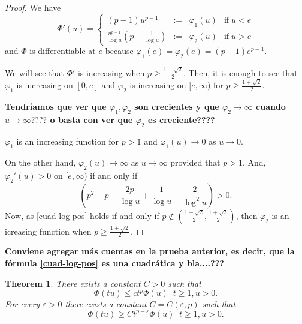 \documentclass[twoside]{article}
\newtheorem{thm}{Theorem}[section]
\theoremstyle{remark}
\renewcommand{\leq}{\leqslant}
\begin{document}
\begin{proof}
We have 
\[\Phi'(u)=\left\{
\begin{array}{cccc}
(p-1)u^{p-1}&:=&\varphi_1(u)& \mbox{if}\;u<e
\\
\frac{u^{p-1}}{\log u}(p-\frac{1}{\log u})&:=&\varphi_2(u)&\mbox{if}\; u>e
\end{array}
\right.
\]
and $\Phi$ is differentiable at $e$ because $\varphi_1(e)=\varphi_2(e)=(p-1)e^{p-1}$.

We will see that $\Phi'$ is increasing when $p\geq \frac{1+\sqrt {2}}{2}$.
Then, it is enough to see that $\varphi_1$ is increasing  on $[0,e]$ and $\varphi_2$ is increasing on 
$[e,\infty)$ for $p\geq \frac{1+\sqrt {2}}{2}$.

{\bf Tendr\'iamos que ver que $\varphi_1,\varphi_2$ son crecientes y que $\varphi_2\to \infty$ cuando
$u \to \infty????$ o basta con ver que $\varphi_2$ es creciente????}

$\varphi_1$ is an increasing function for $p>1$ and $\varphi_1(u)\to 0$ as $u \to 0$.

On the other hand, $\varphi_2(u)\to \infty$ as $u \to \infty$ provided that $p>1$.
And,  
$\varphi_2'(u)>0$
on $[e,\infty)$ if and only if 
\begin{equation}\label{cuad-log-pos}
\left(p^2-p-\frac{2p}{\log u}+\frac{1}{\log u}+\frac{2}{\log^2 u}\right)>0.
\end{equation}
Now, as \eqref{cuad-log-pos} holds if and only if $p \notin(\frac{1-\sqrt2}{2},\frac{1+\sqrt2}{2})$, then $\varphi_2$ is an icreasing function when $p\geq \frac{1+\sqrt2}{2}$.
\end{proof}

{\bf  Conviene agregar m\'as cuentas en la prueba anterior, es decir, que la f\'ormula \eqref{cuad-log-pos} es una cuadr\'atica y bla....???}

\begin{thm}
There exists a constant $C>0$ such that 
\begin{equation}\label{cota-sup-indices}
\Phi(tu)\leq ct^p\Phi(u)\;\;t\geq 1, u>0.
\end{equation}
For every $\varepsilon>0$ there exists a constant $C=C(\varepsilon,p)$ such that
\begin{equation}\label{cota-inf-indices}
\Phi(tu)\geq Ct^{p-\varepsilon}\Phi(u)\;\;t\geq 1,u>0.
\end{equation}
\end{thm}
\end{document}
